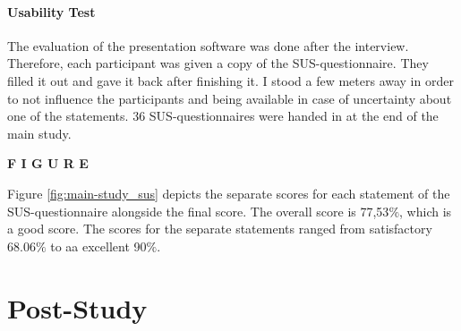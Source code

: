 %


\paragraph{Usability Test} The evaluation of the presentation software was done after the interview. Therefore, each participant was given a copy of the \ac{SUS}-questionnaire. They filled it out and gave it back after finishing it. I stood a few meters away in order to not influence the participants and being available in case of uncertainty about one of the statements. 36 \ac{SUS}-questionnaires were handed in at the end of the main study.

\textbf{F I G U R E}

Figure \ref{fig:main-study_sus} depicts the separate scores for each statement of the \ac{SUS}-questionnaire alongside the final score. The overall score is 77,53$\%$, which is a good score. The scores for the separate statements ranged from satisfactory 68.06$\%$ to aa excellent 90$\%$.


\section{Post-Study}
\label{evaluation_post}

